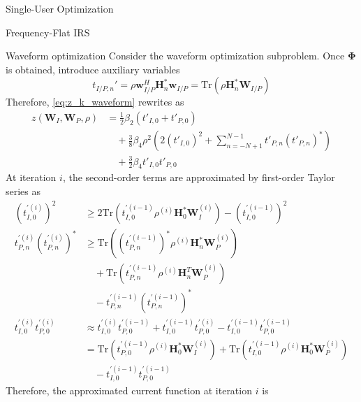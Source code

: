 \documentclass{IEEEtran}
\begin{document}
\begin{section}{Single-User Optimization}
\begin{subsection}{Frequency-Flat IRS}
		\begin{subsubsection}{Waveform optimization}
			Consider the waveform optimization subproblem. Once $\boldsymbol{\Phi}$ is obtained, introduce auxiliary variables
			\begin{equation}\label{eq:t'}
				t_{I/P,n}' = \rho \boldsymbol{w}_{I/P}^H \boldsymbol{H}_n^* \boldsymbol{w}_{I/P} = \mathrm{Tr}(\rho \boldsymbol{H}_n^*\boldsymbol{W}_{I/P})
			\end{equation}
			Therefore, \ref{eq:z_k_waveform} rewrites as
			\begin{equation}\label{eq:z_waveform}
				\begin{split}
					z(\boldsymbol{W}_I,\boldsymbol{W}_P,\rho)
					&=\frac{1}{2} \beta_2 (t'_{I,0}+t'_{P,0})\\
					&\quad+\frac{3}{8}{\beta_4}{\rho^2} \left(2(t'_{I,0})^2 + \sum_{n=-N+1}^{N-1}{t'_{P,n}(t'_{P,n})^*}\right)\\
					&\quad+\frac{3}{2} \beta_4 t'_{I,0}t'_{P,0}
				\end{split}
			\end{equation}
			At iteration $i$, the second-order terms are approximated by first-order Taylor series as
			\begin{align}
				(t_{I,0}^{\prime (i)})^2
				& \ge 2 \mathrm{Tr}\left(t_{I,0}^{\prime (i-1)}\rho^{(i)}\boldsymbol{H}_{0}^*\boldsymbol{W}_{I}^{(i)}\right) - (t_{I,0}^{\prime (i-1)})^2\\
				t_{P,n}^{\prime (i)} (t_{P,n}^{\prime (i)})^*
				& \ge \mathrm{Tr}\left((t_{P,n}^{\prime (i-1)})^*\rho^{(i)}\boldsymbol{H}_{n}^*\boldsymbol{W}_{P}^{(i)}\right)\nonumber\\
				& \quad + \mathrm{Tr}\left(t_{P,n}^{\prime (i-1)}\rho^{(i)}\boldsymbol{H}_{n}^T\boldsymbol{W}_{P}^{(i)}\right)\nonumber\\
				& \quad - t_{P,n}^{\prime (i-1)} (t_{P,n}^{\prime (i-1)})^*\\
				t_{I,0}^{\prime (i)} t_{P,0}^{\prime (i)}
				& \approx t_{I,0}^{\prime (i)} t_{P,0}^{\prime (i-1)} + t_{I,0}^{\prime (i-1)} t_{P,0}^{\prime (i)} - t_{I,0}^{\prime (i-1)} t_{P,0}^{\prime (i-1)}\nonumber\\
				& = \mathrm{Tr}(t_{P,0}^{\prime (i-1)}\rho^{(i)}\boldsymbol{H}_{0}^*\boldsymbol{W}_{I}^{(i)}) + \mathrm{Tr}(t_{I,0}^{\prime (i-1)}\rho^{(i)}\boldsymbol{H}_{0}^*\boldsymbol{W}_{P}^{(i)})\nonumber\\
				& \quad - t_{I,0}^{\prime (i-1)} t_{P,0}^{\prime (i-1)}
			\end{align}
			Therefore, the approximated current function at iteration $i$ is

\end{subsubsection}
\end{subsection}
\end{section}
\end{document}
